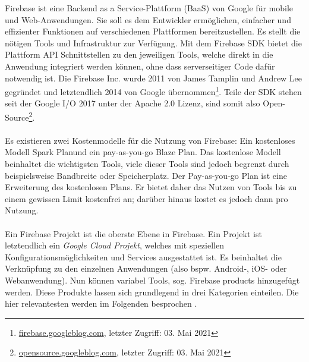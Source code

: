 Firebase ist eine Backend as a Service-Plattform (BaaS)  von Google für mobile und Web-Anwendungen. 
Sie soll es dem Entwickler ermöglichen, einfacher und effizienter Funktionen auf verschiedenen Plattformen bereitzustellen. 
Es stellt die nötigen Tools und Infrastruktur zur Verfügung.
Mit dem Firebase SDK bietet die Plattform API Schnittstellen zu den jeweiligen Tools, welche direkt in die Anwendung integriert werden können, ohne dass serverseitiger Code dafür notwendig ist.
Die Firebase Inc. wurde 2011 von James Tamplin und Andrew Lee gegründet und letztendlich 2014 von Google übernommen\footnote{\href{https://firebase.googleblog.com/2014/10/firebase-is-joining-google.html}{firebase.googleblog.com}, letzter Zugriff: 03. Mai 2021}.
Teile der SDK stehen seit der Google I/O 2017 unter der Apache 2.0 Lizenz, sind somit also Open-Source\footnote{\href{https://opensource.googleblog.com/2017/05/open-sourcing-firebase-sdks.html}{opensource.googleblog.com}, letzter Zugriff: 03. Mai 2021}.\\
\\
Es existieren zwei Kostenmodelle für die Nutzung von Firebase: Ein kostenloses Modell \glqq Spark Plan\grqq und ein pay-as-you-go \glqq Blaze Plan\grqq . Das kostenlose Modell beinhaltet die wichtigsten Tools, viele dieser Tools sind jedoch begrenzt durch beispielsweise Bandbreite oder Speicherplatz.
Der Pay-as-you-go Plan ist eine Erweiterung des kostenlosen Plans. 
Er bietet daher das Nutzen von Tools bis zu einem gewissen Limit kostenfrei an; darüber hinaus kostet es jedoch dann pro Nutzung.\\
\\
Ein Firebase Projekt ist die oberste Ebene in Firebase. 
Ein Projekt ist letztendlich ein \textit{Google Cloud Projekt}, welches mit speziellen Konfigurationsmöglichkeiten und Services ausgestattet ist. 
Es beinhaltet die Verknüpfung zu den einzelnen Anwendungen (also bspw. Android-, iOS- oder Webanwendung). Nun können variabel Tools, sog. Firebase products hinzugefügt werden. Diese Produkte lassen sich grundlegend in drei Kategorien einteilen. Die hier relevantesten werden im Folgenden besprochen \cite{firebase2021}.


